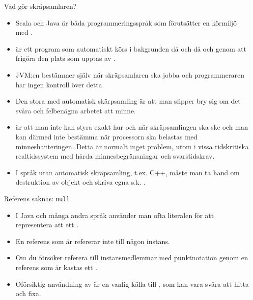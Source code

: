 \begin{Slide}{Vad gör skräpsamlaren?}\SlideFontSmall
\begin{itemize}
\item Scala och Java är båda programmeringsspråk som förutsätter en körmiljö med    .

\item {}  är ett program som automatiskt körs i bakgrunden då och då och  genom att frigöra den plats som upptas av .

\item JVM:en bestämmer själv när skräpsamlaren ska jobba och programmeraren har ingen kontroll över detta.

\item Den stora  med automatisk skärpsamling är att man slipper bry sig om det svåra och felbenägna arbetet att  minne.

\item {} är att man inte kan styra exakt hur och när skräpsamlingen ska ske och man kan därmed inte bestämma när processorn ska belastas med minneshanteringen. Detta är normalt inget problem, utom i vissa tidskritiska realtidssystem med hårda minnesbegränsningar och svarstidskrav.

\item I språk utan automatisk skräpsamling, t.ex. C++, måste man ta hand om destruktion av objekt och skriva egna s.k. . 
\end{itemize}
\end{Slide}



\begin{Slide}{Referens saknas: \texttt{null}}
\begin{itemize}
\item I Java och många andra språk använder man ofta literalen  för att representera att ett .

\item En referens som är  refererar inte till någon instans.

\item Om du försöker referera till instansmedlemmar med punktnotation genom en referens som är  kastas ett  .

\item Oförsiktig användning av  är en vanlig källa till , som kan vara svåra att hitta och fixa.

\end{itemize}
\end{Slide}


